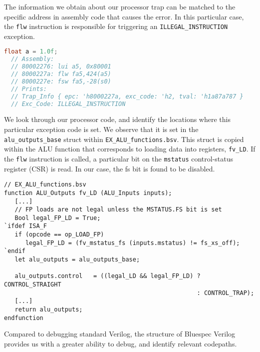 \documentclass[a4paper,8pt]{report}
\begin{document}
The information we obtain about our processor trap can be matched to the
specific address in assembly code that causes the error. In this particular
case, the \texttt{flw} instruction is responsible for triggering an
\texttt{ILLEGAL\_INSTRUCTION} exception.
\begin{lstlisting}[language=C,style=customc]
  float a = 1.0f;
  // Assembly:
  // 80002276: lui a5, 0x80001
  // 8000227a: flw fa5,424(a5)
  // 8000227e: fsw fa5,-28(s0)
  // Prints:
  // Trap_Info { epc: 'h8000227a, exc_code: 'h2, tval: 'h1a87a787 }
  // Exc_Code: ILLEGAL_INSTRUCTION
\end{lstlisting}

We look through our processor code, and identify the locations where this
particular exception code is set. We observe that it is set in the
\texttt{alu\_outputs\_base} struct within \texttt{EX\_ALU\_functions.bsv}. This
struct is copied within the ALU function that corresponds to loading data into
registers, \texttt{fv\_LD}. If the \texttt{flw} instruction is called, a
particular bit on the \texttt{mstatus} control-status register (CSR) is read. In
our case, the fs bit is found to be disabled.
\begin{verbatim}
// EX_ALU_functions.bsv
function ALU_Outputs fv_LD (ALU_Inputs inputs);
   [...]
   // FP loads are not legal unless the MSTATUS.FS bit is set
   Bool legal_FP_LD = True;
`ifdef ISA_F
   if (opcode == op_LOAD_FP)
      legal_FP_LD = (fv_mstatus_fs (inputs.mstatus) != fs_xs_off);
`endif
   let alu_outputs = alu_outputs_base;

   alu_outputs.control   = ((legal_LD && legal_FP_LD) ? CONTROL_STRAIGHT
                                                      : CONTROL_TRAP);
   [...]
   return alu_outputs;
endfunction
\end{verbatim}

Compared to debugging standard Verilog, the structure of Bluespec Verilog
provides us with a greater ability to debug, and identify relevant codepaths.
\end{document}

